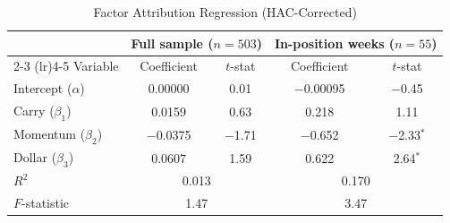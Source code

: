 \documentclass[11pt]{article}
\begin{document}
\begin{table}[H]
\centering
\caption{Factor Attribution Regression (HAC-Corrected)}
\label{tab:factors}
\small
\begin{tabular}{@{}lcccc@{}}
\toprule
& \multicolumn{2}{c}{Full sample ($n = 503$)} & \multicolumn{2}{c}{In-position weeks ($n = 55$)} \\
\cmidrule(lr){2-3} \cmidrule(lr){4-5}
Variable & Coefficient & $t$-stat & Coefficient & $t$-stat \\
\midrule
Intercept ($\alpha$) & 0.00000 & 0.01 & $-$0.00095 & $-$0.45 \\
Carry ($\beta_1$) & 0.0159 & 0.63 & 0.218 & 1.11 \\
Momentum ($\beta_2$) & $-$0.0375 & $-$1.71 & $-$0.652 & $-$2.33$^{*}$ \\
Dollar ($\beta_3$) & 0.0607 & 1.59 & 0.622 & 2.64$^{*}$ \\
$R^2$ & \multicolumn{2}{c}{0.013} & \multicolumn{2}{c}{0.170} \\
$F$-statistic & \multicolumn{2}{c}{1.47} & \multicolumn{2}{c}{3.47} \\
\bottomrule
\end{tabular}
\par\vspace{0.3em}

\end{table}
\end{document}
